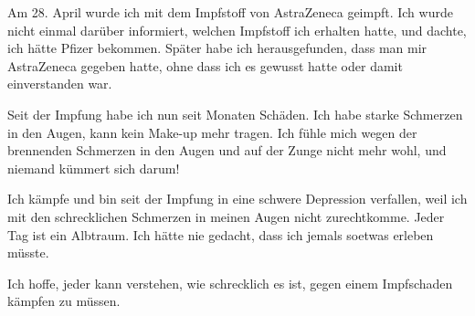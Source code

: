 Am 28. April wurde ich mit dem Impfstoff von AstraZeneca geimpft. Ich wurde
nicht einmal darüber informiert, welchen Impfstoff ich erhalten hatte, und
dachte, ich hätte Pfizer bekommen. Später habe ich herausgefunden, dass man mir
AstraZeneca gegeben hatte, ohne dass ich es gewusst hatte oder damit
einverstanden war.

Seit der Impfung habe ich nun seit Monaten Schäden. Ich habe starke Schmerzen in
den Augen, kann kein Make-up mehr tragen. Ich fühle mich wegen der brennenden
Schmerzen in den Augen und auf der Zunge nicht mehr wohl, und niemand kümmert
sich darum!

Ich kämpfe und bin seit der Impfung in eine schwere Depression verfallen, weil
ich mit den schrecklichen Schmerzen in meinen Augen nicht zurechtkomme. Jeder
Tag ist ein Albtraum. Ich hätte nie gedacht, dass ich jemals soetwas erleben
müsste.

Ich hoffe, jeder kann verstehen, wie schrecklich es ist, gegen einem Impfschaden
kämpfen zu müssen.
